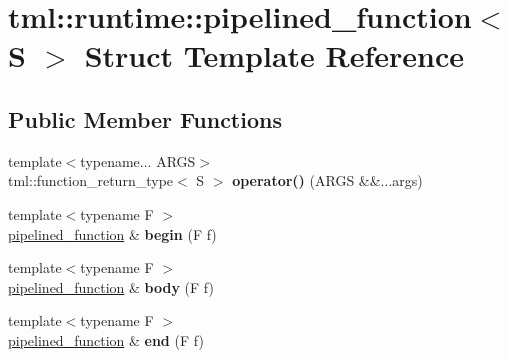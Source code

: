 \hypertarget{structtml_1_1runtime_1_1pipelined__function}{\section{tml\+:\+:runtime\+:\+:pipelined\+\_\+function$<$ S $>$ Struct Template Reference}
\label{structtml_1_1runtime_1_1pipelined__function}
}
\subsection*{Public Member Functions}
\begin{DoxyCompactItemize}
\item 
\hypertarget{structtml_1_1runtime_1_1pipelined__function_ae05535c5a51440c137e5120ffcd9346c}{{\footnotesize template$<$typename... A\+R\+G\+S$>$ }\\tml\+::function\+\_\+return\+\_\+type$<$ S $>$ {\bfseries operator()} (A\+R\+G\+S \&\&...args)}\label{structtml_1_1runtime_1_1pipelined__function_ae05535c5a51440c137e5120ffcd9346c}

\item 
\hypertarget{structtml_1_1runtime_1_1pipelined__function_af4fa0e88f89a1fa3800361cc5cde2712}{{\footnotesize template$<$typename F $>$ }\\\hyperlink{structtml_1_1runtime_1_1pipelined__function}{pipelined\+\_\+function} \& {\bfseries begin} (F f)}\label{structtml_1_1runtime_1_1pipelined__function_af4fa0e88f89a1fa3800361cc5cde2712}

\item 
\hypertarget{structtml_1_1runtime_1_1pipelined__function_a1af710ab666b5a8e45dad01664ca38ba}{{\footnotesize template$<$typename F $>$ }\\\hyperlink{structtml_1_1runtime_1_1pipelined__function}{pipelined\+\_\+function} \& {\bfseries body} (F f)}\label{structtml_1_1runtime_1_1pipelined__function_a1af710ab666b5a8e45dad01664ca38ba}

\item 
\hypertarget{structtml_1_1runtime_1_1pipelined__function_aa56ca403b77b349831e5b33d66765e91}{{\footnotesize template$<$typename F $>$ }\\\hyperlink{structtml_1_1runtime_1_1pipelined__function}{pipelined\+\_\+function} \& {\bfseries end} (F f)}\label{structtml_1_1runtime_1_1pipelined__function_aa56ca403b77b349831e5b33d66765e91}

\end{DoxyCompactItemize}


